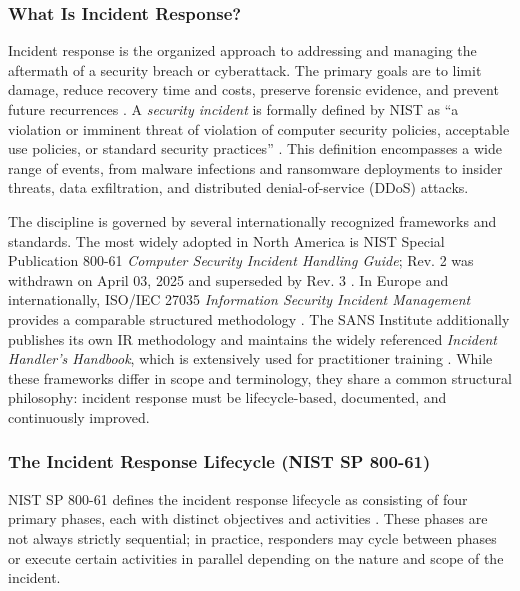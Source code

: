 \subsubsection{What Is Incident Response?}

Incident response is the organized approach to addressing and managing the aftermath of a security breach or cyberattack.
The primary goals are to limit damage, reduce recovery time and costs, preserve forensic evidence, and prevent future recurrences \citep{nist2025}.
A \textit{security incident} is formally defined by NIST as ``a violation or imminent threat of violation of computer security policies, acceptable use policies, or standard security practices'' \citep{nist2025}.
This definition encompasses a wide range of events, from malware infections and ransomware deployments to insider threats, data exfiltration, and distributed denial-of-service (DDoS) attacks.

The discipline is governed by several internationally recognized frameworks and standards.
The most widely adopted in North America is NIST Special Publication 800-61 \textit{Computer Security Incident Handling Guide}; Rev. 2 was withdrawn on April 03, 2025 and superseded by Rev. 3 \citep{nist2025,nistrev3update}.
In Europe and internationally, ISO/IEC 27035 \textit{Information Security Incident Management} provides a comparable structured methodology \citep{iso27035}.
The SANS Institute additionally publishes its own IR methodology and maintains the widely referenced \textit{Incident Handler's Handbook}, which is extensively used for practitioner training \citep{sans2021}.
While these frameworks differ in scope and terminology, they share a common structural philosophy: incident response must be lifecycle-based, documented, and continuously improved.

\subsubsection{The Incident Response Lifecycle (NIST SP 800-61)}

NIST SP 800-61 defines the incident response lifecycle as consisting of four primary phases, each with distinct objectives and activities \autocite{nist2025}.
These phases are not always strictly sequential; in practice, responders may cycle between phases or execute certain activities in parallel depending on the nature and scope of the incident.

